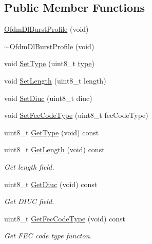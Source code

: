 \subsection*{Public Member Functions}
\begin{DoxyCompactItemize}
\item 
\hyperlink{classns3_1_1OfdmDlBurstProfile_a548d7d2dd01fbd8d759768026067f05a}{Ofdm\+Dl\+Burst\+Profile} (void)
\item 
\hyperlink{classns3_1_1OfdmDlBurstProfile_a8f3b151522a91c989f62a467e9d64e37}{$\sim$\+Ofdm\+Dl\+Burst\+Profile} (void)
\item 
void \hyperlink{classns3_1_1OfdmDlBurstProfile_ab68301ea6a976bafdd78006670573e1e}{Set\+Type} (uint8\+\_\+t \hyperlink{visualizer-ideas_8txt_add98db9e15e2a58cf2b57623e7aa893a}{type})
\item 
void \hyperlink{classns3_1_1OfdmDlBurstProfile_a960e4ad5656843483b5909c921d1c121}{Set\+Length} (uint8\+\_\+t length)
\item 
void \hyperlink{classns3_1_1OfdmDlBurstProfile_ae3d4ef4e16c600092b10354749fb6d2f}{Set\+Diuc} (uint8\+\_\+t diuc)
\item 
void \hyperlink{classns3_1_1OfdmDlBurstProfile_a820825183214aaa1c788ea3a1f3b240d}{Set\+Fec\+Code\+Type} (uint8\+\_\+t fec\+Code\+Type)
\item 
uint8\+\_\+t \hyperlink{classns3_1_1OfdmDlBurstProfile_a311fd62ddf335c8ab58c543f42010697}{Get\+Type} (void) const 
\item 
uint8\+\_\+t \hyperlink{classns3_1_1OfdmDlBurstProfile_a374e63b2a32cdfccf729e83edc49a073}{Get\+Length} (void) const 
\begin{DoxyCompactList}\small\item\em Get length field. \end{DoxyCompactList}\item 
uint8\+\_\+t \hyperlink{classns3_1_1OfdmDlBurstProfile_afcfa5afde9a6989a3a265b9fdfa93129}{Get\+Diuc} (void) const 
\begin{DoxyCompactList}\small\item\em Get D\+I\+UC field. \end{DoxyCompactList}\item 
uint8\+\_\+t \hyperlink{classns3_1_1OfdmDlBurstProfile_a4818f33e0e3ff51428828f4721bee212}{Get\+Fec\+Code\+Type} (void) const 
\begin{DoxyCompactList}\small\item\em Get F\+EC code type functon. \end{DoxyCompactList}\item 

\end{DoxyCompactItemize}
